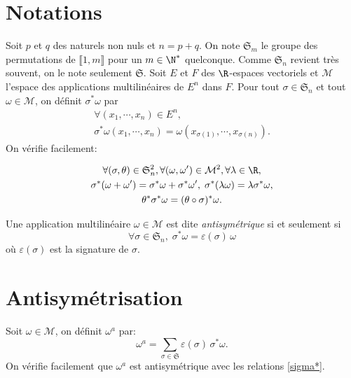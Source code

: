  

\section*{Notations}
Soit $p$ et $q$ des naturels non nuls et $n = p + q$.\newline
On note $\mathfrak{S}_m$ le groupe des permutations de $\llbracket 1, m \rrbracket$ pour un $m\in \N^*$ quelconque. Comme $\mathfrak{S}_n$ revient très souvent, on le note seulement $\mathfrak{S}$.\newline
Soit $E$ et $F$ des $\R$-espaces vectoriels et $\mathcal{M}$ l'espace des applications multilinéaires de $E^n$ dans $F$.\newline
Pour tout $\sigma \in \mathfrak{S}_n$ et tout $\omega\in \mathcal{M}$, on définit $\sigma^* \omega$ par
\begin{multline*}
 \forall (x_1,\cdots,x_n)\in E^n, \\
 \sigma^*\omega(x_1,\cdots,x_n) = \omega(x_{\sigma(1)},\cdots,x_{\sigma(n)}).
\end{multline*}
On vérifie facilement:

\begin{multline} \label{sigma*}
 \forall (\sigma, \theta) \in \mathfrak{S}_{n}^2, \forall(\omega, \omega')\in \mathcal{M}^2, \forall \lambda \in \R,\\
 \sigma^*(\omega + \omega') = \sigma^*\omega + \sigma^*\omega', \;
 \sigma^*(\lambda \omega) = \lambda \sigma^* \omega, \\
 \theta^* \sigma^* \omega = (\theta \circ \sigma)^* \omega.
\end{multline} 

Une application multilinéaire $\omega \in \mathcal{M}$ est dite \emph{antisymétrique} si et seulement si
\[
 \forall \sigma \in \mathfrak{S}_n, \;
 \sigma^* \omega = \varepsilon(\sigma) \,\omega
\]
où $\varepsilon(\sigma)$ est la signature de $\sigma$.

\section*{Antisymétrisation}
Soit $\omega \in \mathcal{M}$, on définit $\omega^a$ par:
\[
 \omega^a = \sum_{\sigma \in \mathfrak{S}} \varepsilon(\sigma)\,\sigma^* \omega.
\]
On vérifie facilement que $\omega^a$ est antisymétrique avec les relations \ref{sigma*}.

